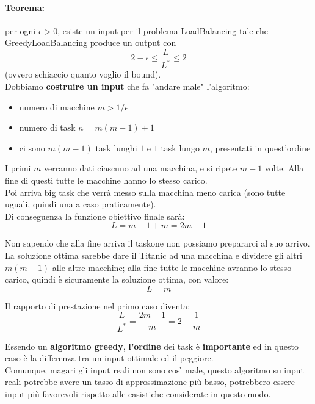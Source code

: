 \documentclass[11pt]{article}
\begin{document}
	\paragraph{Teorema:} per ogni $\epsilon > 0$, esiste un input per il problema LoadBalancing tale che GreedyLoadBalancing produce un output con 
	$$ 2 - \epsilon \leq \frac{L}{L^\ast} \leq 2$$
	(ovvero schiaccio quanto voglio il bound).\\
	
	Dobbiamo \textbf{costruire un input} che fa "andare male" l'algoritmo:
	\begin{itemize}
		\item numero di macchine $m > 1/ \epsilon$
		\item numero di task $n = m(m-1)+1$
		\item ci sono $m(m-1)$ task lunghi $1$ e $1$ task lungo $m$, presentati in quest'ordine
	\end{itemize}
	
	I primi $m$ verranno dati ciascuno ad una macchina, e si ripete $m-1$ volte. Alla fine di questi tutte le macchine hanno lo stesso carico.\\
	Poi arriva big task che verrà messo sulla macchina meno carica (sono tutte uguali, quindi una a caso praticamente).\\
	
	Di conseguenza la funzione obiettivo finale sarà:
	$$ L = m - 1 + m = 2m - 1 $$
	
	Non sapendo che alla fine arriva il taskone non possiamo prepararci al suo arrivo. La soluzione ottima sarebbe dare il Titanic ad una macchina e dividere gli altri $m(m-1)$ alle altre macchine; alla fine tutte le macchine avranno lo stesso carico, quindi è sicuramente la soluzione ottima, con valore:
	$$ L = m $$
	
	Il rapporto di prestazione nel primo caso diventa:
	$$ \frac{L}{L^\ast} = \frac{2m-1}{m} = 2 - \frac{1}{m} $$
	
	Essendo un \textbf{algoritmo greedy}, \textbf{l'ordine} dei task è \textbf{importante} ed in questo caso è la differenza tra un input ottimale ed il peggiore.\\
	
	Comunque, magari gli input reali non sono così male, questo algoritmo su input reali potrebbe avere un tasso di approssimazione più basso, potrebbero essere input più favorevoli rispetto alle casistiche considerate in questo modo.\\
	
\end{document}
